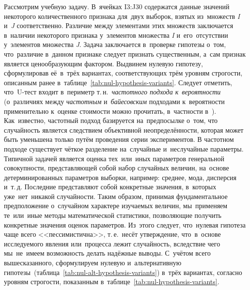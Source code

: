 \documentclass[]{scrreprt}
\begin{document}
Рассмотрим учебную задачу. В~ячейках I3:J30 содержатся данные значений некоторого количественного признака для~двух выборок, взятых из~множеств \textit{I} и~\textit{J} соответственно. Различие между элементами этих множеств заключается в~наличии некоторого признака у~элементов множества \textit{I} и~его~отсутствии у~элементов множества \textit{J}. Задача заключается в~проверке гипотезы о~том, что~различие в~данном признаке следует признать существенным, а~сам признак является ценообразующим фактором. Выдвинем нулевую гипотезу, сформулировав её~в~трёх вариантах, соответствующих трём уровням строгости, описанным ранее в~таблице~\ref{tab:nul-hypothesis-variants}. Следует отметить, что~U-тест входит в~периметр т.\,н.~\emph{частотного подхода к~вероятности} (о~различиях между \emph{частотным} и~\emph{байесовским} подходами к~вероятности применительно к~оценке стоимости можно прочитать, в~частности в~\cite{Murashev:freq-baye-prob}). Как~известно, частотный подход базируется на~предпосылке о~том, что случайность является следствием объективной неопределённости, которая может быть уменьшена только путём проведения серии экспериментов. В частотном подходе существует чёткое разделение на~случайные и~неслучайные параметры. Типичной задачей является оценка тех~или~иных параметров генеральной совокупности, представляющей собой набор случайных величин, на~основе детерминированных параметров выборки, например: среднее, мода, дисперсия и~т.\,д. Последние представляют собой конкретные значения, в~которых уже~нет~никакой случайности. Таким образом, принимая фундаментальное предположение о~случайном характере изучаемых величин, мы~применяем те~или~иные методы математической статистики, позволяющие получить конкретные значения оценок параметров. Из~этого следует, что~нулевая гипотеза чаще всего <<пессимистична>>, т.\,е.~несёт утверждение, что~в~основе исследуемого явления или~процесса лежит случайность, вследствие чего мы~не~имеем возможность делать надёжные выводы. С~учётом всего вышесказанного, сформулируем нулевую и~альтернативную гипотезы~(таблица~\ref{tab:nul-alt-hypothesis-variants}) в~трёх вариантах, согласно уровням строгости, показанным в~таблице~\ref{tab:nul-hypothesis-variants}.
\end{document}
